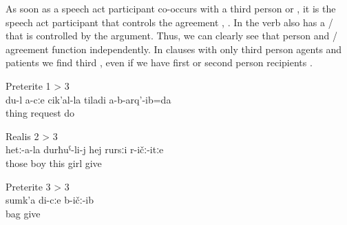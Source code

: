 As soon as a speech act participant co-occurs with a third person  or , it is the speech act participant that controls the agreement , . In  the verb also has a /  that is controlled by the  argument. Thus, we can clearly see that person and / agreement function independently. In clauses with only third person agents and patients we find third , even if we have first or second person recipients .
%
\begin{exe}
		\ex	Preterite 1 > 3\\		\label{ex:I did not ask you anything PT13}
		\gll	du-l	a-cːe	cik'al-la	tiladi	a-b-arq'-ib=da\\
					thing	request	do\\
		\glt	{}

		\ex	Realis  2 > 3\\	\label{ex:‎‎if you give the girl to their son RC23}
		\gll	hetː-a-la	durħuˁ-li-j	hej	rursːi	r-ičː-itːe\\
			those	boy	this	girl	give\\
		\glt	{}

		\ex	Preterite 3 > 3\\		\label{ex:(He) gave me his bag PT33}
		\gll	sumk'a	di-cːe	b-ičː-ib\\
			bag		give\\
		\glt	{}
\end{exe}
%


